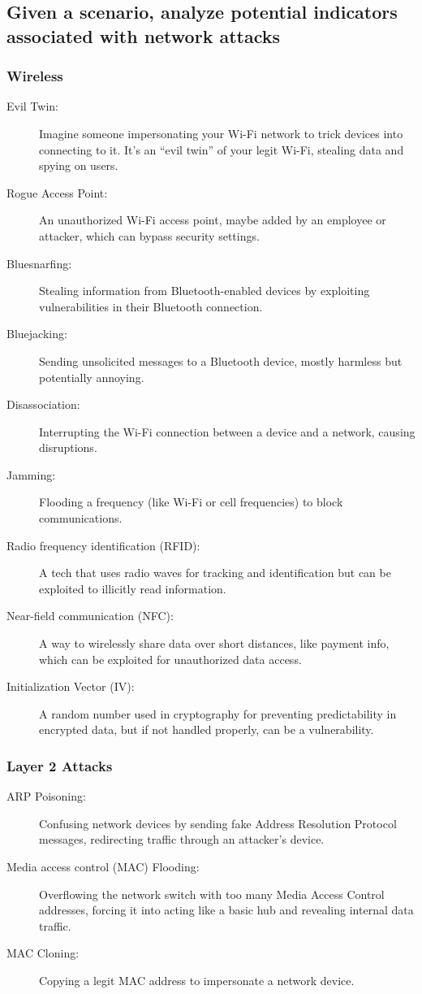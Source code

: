 \begin{fullwidth} 
    \subsection{Given a scenario, analyze potential indicators associated with network attacks}
    \subsubsection*{\color{red}Wireless}
    \begin{description}
        \item[Evil Twin:] Imagine someone impersonating your Wi-Fi network to trick devices into connecting to it. It’s an “evil twin” of your legit Wi-Fi, stealing data and spying on users.
        \item[Rogue Access Point:] An unauthorized Wi-Fi access point, maybe added by an employee or attacker, which can bypass security settings.
        \item[Bluesnarfing:] Stealing information from Bluetooth-enabled devices by exploiting vulnerabilities in their Bluetooth connection.
        \item[Bluejacking:] Sending unsolicited messages to a Bluetooth device, mostly harmless but potentially annoying.
        \item[Disassociation:] Interrupting the Wi-Fi connection between a device and a network, causing disruptions.
        \item[Jamming:] Flooding a frequency (like Wi-Fi or cell frequencies) to block communications.
        \item[Radio frequency identification (RFID):] A tech that uses radio waves for tracking and identification but can be exploited to illicitly read information.
        \item[Near-field communication (NFC):] A way to wirelessly share data over short distances, like payment info, which can be exploited for unauthorized data access.
        \item[Initialization Vector (IV):] A random number used in cryptography for preventing predictability in encrypted data, but if not handled properly, can be a vulnerability. 
    \end{description}
    \subsubsection*{\color{Purple}Layer 2 Attacks}
    \begin{description}
        \item[ARP Poisoning:] Confusing network devices by sending fake Address Resolution Protocol messages, redirecting traffic through an attacker’s device.
        \item[Media access control (MAC) Flooding:] Overflowing the network switch with too many Media Access Control addresses, forcing it into acting like a basic hub and revealing internal data traffic.
        \item[MAC Cloning:] Copying a legit MAC address to impersonate a network device.
    \end{description}


\end{fullwidth}
